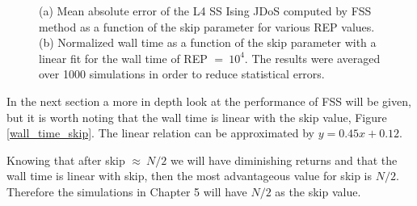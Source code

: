 \begin{figure}[h]
	\centering
	\caption{(a) Mean absolute error of the L4 SS Ising JDoS computed by FSS method as a function of the skip parameter for various REP values. (b) Normalized wall time as a function of the skip parameter with a linear fit for the wall time of REP $=\ 10^4$. The results were averaged over 1000 simulations in order to reduce statistical errors.}
\end{figure}

	In the next section a more in depth look at the performance of FSS will be given, but it is worth noting that the wall time is linear with the skip value, Figure \ref{wall_time_skip}. The linear relation can be approximated by $y=0.45x + 0.12$. 

	Knowing that after skip $\approx\ N/2$ we will have diminishing returns and that the wall time is linear with skip, then the most advantageous value for skip is $N/2$. Therefore the simulations in Chapter 5 will have $N/2$ as the skip value.
























